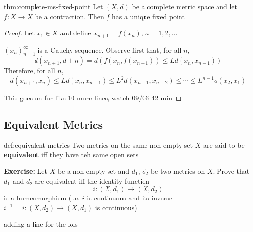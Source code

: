 \documentclass{article}
\begin{document}
\begin{thm}{thm:complete-ms-fixed-point}{}
    Let $(X, d)$ be a complete metric space and let $f : X \to X$ be a contraction. Then $f$ has a unique fixed point
\end{thm}

\begin{proof}
    Let $x_{1}\in X$ and define $x_{n+1} = f(x_{n}),\, n = 1,2,\dots$

    $(x_{n})^{\infty}_{n = 1}$ is a Cauchy sequence. Observe first that, for all $n$,
    \[d(x_{n+1}, d+n) = d(f(x_{n}, f(x_{n-1})) \le L d(x_{n}, x_{n-1}))\]
    Therefore, for all $n$,
    \[d(x_{n+1}, x_{n}) \le Ld(x_{n}, x_{n-1})\le L^{2}d(x_{n-1},x_{n-2}) \le \cdots \le L^{n-1}d(x_{2}, x_{1})\]

    This goes on for like 10 more lines, watch 09/06 42 min
\end{proof}

\subsection{Equivalent Metrics}
\begin{dfn}{def:equivalent-metrics}{}
    Two metrics on the same non-empty set $X$ are said to be \textbf{equivalent} iff they have teh same open sets
\end{dfn}

\textbf{Exercise:} Let $X$ be a non-empty set and $d_{1},\,d_{2}$ be two metrics on $X$. Prove that $d_{1}$ and $d_{2}$ are equivalent iff the identity function
\[i : (X, d_{1}) \to (X, d_{2})\]
is a homeomorphism (i.e. $i$ is continuous and its inverse $i^{-1} = i : (X, d_{2})\to (X, d_{1})$ is continuous)

adding a line for the lols
\end{document}
